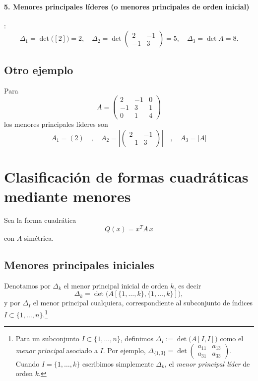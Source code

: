 \documentclass{article}
\begin{document}
\paragraph*{5. Menores principales líderes (o menores principales de orden inicial)}:
\[
\Delta_1 = \det\bigl([2]\bigr)=2,
\quad
\Delta_2 = \det\!\begin{pmatrix}2&-1\\-1&3\end{pmatrix}=5,
\quad
\Delta_3 = \det A = 8.
\]

\subsection*{Otro ejemplo}
Para  
\[
A = 
\begin{pmatrix}
2 & -1 & 0\\
-1 & 3 & 1\\
0 & 1 & 4
\end{pmatrix}
\]
los menores principales líderes son  
\[
A_1 = (2)
\quad,\quad
A_2 = |
\begin{pmatrix}
2 & -1\\
-1 & 3
\end{pmatrix}|
\quad,\quad
A_3 = |A|
\]


\section*{Clasificación de formas cuadráticas mediante menores}

Sea la forma cuadrática  
\[
Q(x) = x^T A\,x
\]
con \(A\) simétrica.

\subsection*{Menores principales iniciales}
Denotamos por \(\Delta_k\) el menor principal inicial de orden \(k\), es decir
\[
\Delta_k = \det\bigl(A[\{1,\dots,k\},\{1,\dots,k\}]\bigr),
\]
y por \(\Delta_I\) el menor principal cualquiera, correspondiente al subconjunto de índices \(I\subset\{1,\dots,n\}\).\footnote{Para un subconjunto $I\subset\{1,\dots,n\}$, definimos $\Delta_I:=\det\!\big(A[I,I]\big)$ como el \emph{menor principal} asociado a $I$. Por ejemplo, $\Delta_{\{1,3\}}=\det\!\begin{pmatrix}a_{11}&a_{13}\\ a_{31}&a_{33}\end{pmatrix}$. Cuando $I=\{1,\dots,k\}$ escribimos simplemente $\Delta_k$, el \emph{menor principal líder} de orden $k$.}
\end{document}
